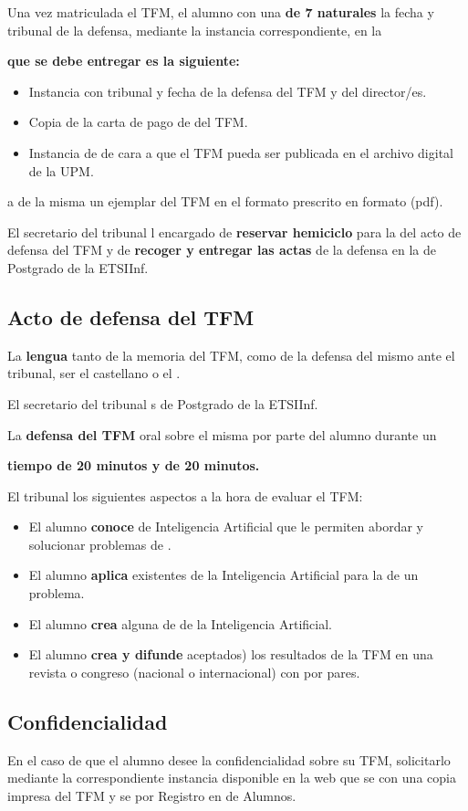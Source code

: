 Una vez matriculada el TFM, el alumno  con una {\bf  de 7  naturales} la fecha y tribunal de la defensa, mediante la instancia correspondiente, en la {\bf  que se debe entregar es la siguiente:
	
	\begin{itemize}
		\item Instancia con tribunal y fecha de la defensa del TFM y  del director/es.
		\item Copia de la carta de pago de  del TFM.
		\item Instancia de  de cara a que el TFM pueda ser publicada en el archivo digital de la UPM.
	\end{itemize}
	a de la misma un ejemplar del TFM en el formato prescrito en formato  (pdf).
	
	El secretario del tribunal l encargado de {\bf reservar hemiciclo} para la  del acto de defensa del TFM y de {\bf recoger y entregar las actas} de la defensa en la  de Postgrado de la ETSIInf.
	
	\subsection{Acto de defensa del TFM}
	\noindent La {\bf lengua} tanto de la memoria del TFM, como de la defensa del mismo ante el tribunal,  ser el castellano o el .
	
	El secretario del tribunal s de Postgrado de la ETSIInf.
	
	La {\bf defensa del TFM}  oral sobre el misma por parte del alumno durante un {\bf tiempo  de 20 minutos y  de 20 minutos.
		
		El tribunal  los siguientes aspectos a la hora de evaluar el TFM:
		\begin{itemize}
			\item El alumno {\bf conoce}  de Inteligencia Artificial que le permiten abordar y solucionar problemas de .
			\item El alumno {\bf aplica}  existentes de la Inteligencia Artificial para la  de un problema.
			\item El alumno {\bf crea} alguna  de  de la Inteligencia Artificial.
			\item El alumno {\bf crea y difunde}  aceptados) los resultados de la TFM en una revista o congreso (nacional o internacional) con  por pares.
		\end{itemize}
		
		
		
		\subsection{Confidencialidad}
		\noindent En el caso de que el alumno desee la confidencialidad sobre su TFM,  solicitarlo mediante la correspondiente instancia disponible en la web que se  con una copia impresa del TFM y se  por Registro en  de Alumnos.
		
}}
